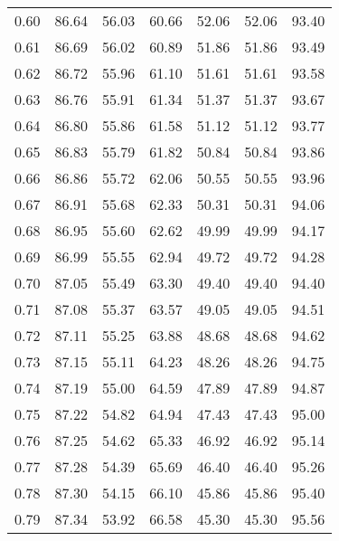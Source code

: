 \begin{tabular}{|c|c|c|c|c|c|c|}
      0.60 &     86.64 &     56.03 &      60.66 &   52.06 &      52.06 &         93.40 \\
      0.61 &     86.69 &     56.02 &      60.89 &   51.86 &      51.86 &         93.49 \\
      0.62 &     86.72 &     55.96 &      61.10 &   51.61 &      51.61 &         93.58 \\
      0.63 &     86.76 &     55.91 &      61.34 &   51.37 &      51.37 &         93.67 \\
      0.64 &     86.80 &     55.86 &      61.58 &   51.12 &      51.12 &         93.77 \\
      0.65 &     86.83 &     55.79 &      61.82 &   50.84 &      50.84 &         93.86 \\
      0.66 &     86.86 &     55.72 &      62.06 &   50.55 &      50.55 &         93.96 \\
      0.67 &     86.91 &     55.68 &      62.33 &   50.31 &      50.31 &         94.06 \\
      0.68 &     86.95 &     55.60 &      62.62 &   49.99 &      49.99 &         94.17 \\
      0.69 &     86.99 &     55.55 &      62.94 &   49.72 &      49.72 &         94.28 \\
      0.70 &     87.05 &     55.49 &      63.30 &   49.40 &      49.40 &         94.40 \\
      0.71 &     87.08 &     55.37 &      63.57 &   49.05 &      49.05 &         94.51 \\
      0.72 &     87.11 &     55.25 &      63.88 &   48.68 &      48.68 &         94.62 \\
      0.73 &     87.15 &     55.11 &      64.23 &   48.26 &      48.26 &         94.75 \\
      0.74 &     87.19 &     55.00 &      64.59 &   47.89 &      47.89 &         94.87 \\
      0.75 &     87.22 &     54.82 &      64.94 &   47.43 &      47.43 &         95.00 \\
      0.76 &     87.25 &     54.62 &      65.33 &   46.92 &      46.92 &         95.14 \\
      0.77 &     87.28 &     54.39 &      65.69 &   46.40 &      46.40 &         95.26 \\
      0.78 &     87.30 &     54.15 &      66.10 &   45.86 &      45.86 &         95.40 \\
      0.79 &     87.34 &     53.92 &      66.58 &   45.30 &      45.30 &         95.56 \\

\end{tabular}
